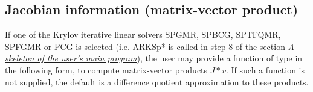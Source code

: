 \documentclass[letterpaper,10pt,english]{sphinxmanual}
\begin{document}
\subsection{Jacobian information (matrix-vector product)}
\label{c_interface/User_supplied:cinterface-jtimesfn}\label{c_interface/User_supplied:jacobian-information-matrix-vector-product}
If one of the Krylov iterative linear solvers SPGMR, SPBCG, SPTFQMR,
SPFGMR or PCG is selected (i.e. ARKSp* is called in step 8 of the
section {\hyperref[c_interface/Skeleton:cinterface-skeleton]{\emph{A skeleton of the user's main program}}}), the user may provide a function
of type {\hyperref[c_interface/User_supplied:ARKSpilsJacTimesVecFn]{}} in the following form, to
compute matrix-vector products $J*v$. If such a function is not
supplied, the default is a difference quotient approximation to these
products.
\end{document}
